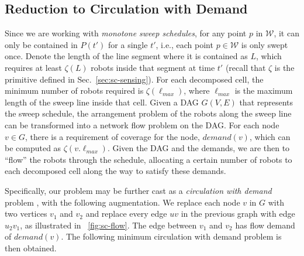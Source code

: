 \subsection{Reduction to Circulation with Demand}
Since we are working with \emph{monotone sweep schedules}, for any point $p$ in 
$\mathcal W$, it can only be contained in $P(t')$ for a single $t'$, i.e., each 
point $p \in \mathcal W$ is only swept once. 
%
Denote the length of the line segment where it is contained as $L$, which 
requires at least $\zeta(L)$ robots inside that segment at time $t'$
(recall that $\zeta$ is the primitive defined in Sec.~\ref{sec:sc-sensing}).
%
For each decomposed cell, the minimum number of robots required is $\zeta(\ell_{max})$, where $\ell_{max}$ 
is the maximum length of the sweep line inside that cell.
%
Given a DAG $G(V,E)$ that represents the sweep schedule, the arrangement problem of the robots along the sweep line can be transformed into a network 
flow problem on the DAG.
%
For each node $v\in G$, there is a requirement of coverage for the node, 
$demand(v)$, which can be computed as $\zeta(v.\ell_{max})$.
%
Given the DAG and the demands, we are then to ``flow'' the robots through 
the schedule, allocating a certain number of robots to each decomposed cell 
along the way to satisfy these demands. 
%

Specifically, our problem may be further cast as a \emph{circulation with demand} 
problem \cite{kleinberg2006algorithm}, with the following augmentation. We replace 
each node $v$ in $G$ with two vertices $v_1$ and $v_2$ and replace every edge 
$uv$ in the previous graph with edge $u_2 v_1$, as illustrated in ~\ref{fig:sc-flow}. 
The edge between $v_1$ and $v_2$ has flow demand of $demand(v)$. 
The following minimum circulation with demand problem is then obtained.

